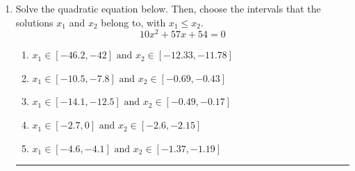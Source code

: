 \documentclass[14pt]{extbook}
\newcommand{\litem}[1]{\item#1\hspace*{-1cm}\rule{\textwidth}{0.4pt}}
\begin{document}
\begin{enumerate}
\litem{
Solve the quadratic equation below. Then, choose the intervals that the solutions $x_1$ and $x_2$ belong to, with $x_1 \leq x_2$.\[ 10x^{2} +57 x + 54 = 0 \]\begin{enumerate}[label=\Alph*.]
\item \( x_1 \in [-46.2, -42] \text{ and } x_2 \in [-12.33, -11.78] \)
\item \( x_1 \in [-10.5, -7.8] \text{ and } x_2 \in [-0.69, -0.43] \)
\item \( x_1 \in [-14.1, -12.5] \text{ and } x_2 \in [-0.49, -0.17] \)
\item \( x_1 \in [-2.7, 0] \text{ and } x_2 \in [-2.6, -2.15] \)
\item \( x_1 \in [-4.6, -4.1] \text{ and } x_2 \in [-1.37, -1.19] \)


\end{enumerate}}
\end{enumerate}
\end{document}
